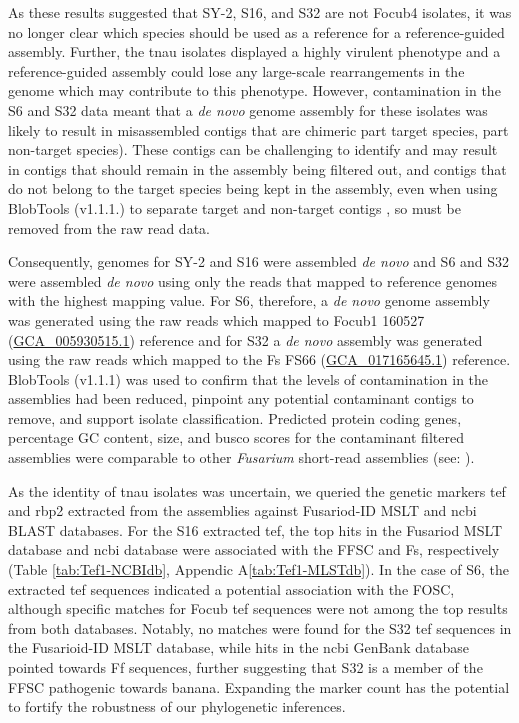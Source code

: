 As these results suggested that SY-2, S16, and S32 are not \ac{Focub4} isolates, it was no longer clear which species should be used as a reference for a reference-guided assembly. Further, the \ac{tnau} isolates displayed a highly virulent phenotype and a reference-guided assembly could lose any large-scale rearrangements in the genome which may contribute to this phenotype. However, contamination in the S6 and S32 data meant that a \textit{de novo} genome assembly for these isolates was likely to result in misassembled contigs that are chimeric part target species, part non-target species). These contigs can be challenging to identify and may result in contigs that should remain in the assembly being filtered out, and contigs that do not belong to the target species being kept in the assembly, even when using BlobTools (v1.1.1.) to separate target and non-target contigs \parencite{Cornet2022}, so must be removed from the raw read data. 

Consequently, genomes for SY-2 and S16 were assembled \textit{de novo} and S6 and S32 were assembled \textit{de novo} using only the reads that mapped to reference genomes with the highest mapping value. For S6, therefore, a \textit{de novo} genome assembly was generated using the raw reads which mapped to \ac{Focub1} 160527 (\href{https://www.ncbi.nlm.nih.gov/datasets/genome/GCA_005930515.1/}{GCA\_005930515.1}) reference and for S32 a \textit{de novo} assembly was generated using the raw reads which mapped to the \ac{Fs} FS66 (\href{https://www.ncbi.nlm.nih.gov/datasets/genome/GCA_017165645.1/}{GCA\_017165645.1}) reference. BlobTools (v1.1.1) was used to confirm that the levels of contamination in the assemblies had been reduced, pinpoint any potential contaminant contigs to remove, and support isolate classification. Predicted protein coding genes, percentage GC content, size, and \ac{busco} scores for the contaminant filtered assemblies were comparable to other \textit{Fusarium} short-read assemblies (see: \textcite{DitaHerai2013, Chiara2015, Srivastava2018}).

As the identity of \ac{tnau} isolates was uncertain, we queried the genetic markers \acf{tef} and \acf{rbp2} extracted from the assemblies against Fusariod-ID MSLT and \ac{ncbi} BLAST databases. For the S16 extracted \ac{tef}, the top hits in the Fusariod MSLT database and \ac{ncbi} database were associated with the \ac{FFSC} and \ac{Fs}, respectively (Table \ref{tab:Tef1-NCBIdb}, Appendic A\ref{tab:Tef1-MLSTdb}). In the case of S6, the extracted \ac{tef} sequences indicated a potential association with the \ac{FOSC}, although specific matches for \ac{Focub} \ac{tef} sequences were not among the top results from both databases. Notably, no matches were found for the S32 \ac{tef} sequences in the Fusarioid-ID MSLT database, while hits in the \ac{ncbi} GenBank database pointed towards \ac{Ff} sequences, further suggesting that S32 is a member of the \ac{FFSC} pathogenic towards banana. Expanding the marker count has the potential to fortify the robustness of our phylogenetic inferences. 

